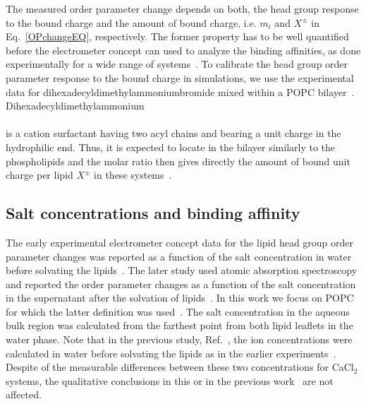 \documentclass[aip,jcp,twocolumn]{revtex4}
\begin{document}
The measured order parameter change depends on both, the head group response 
to the bound charge and the amount of bound charge, i.e. $m_i$ and $X^\pm$
in Eq.~\ref{OPchangeEQ}, respectively. The former property has to be
well quantified before the electrometer concept can used to 
analyze the binding affinities, as done experimentally for a wide range
of systems~\cite{seelig87,beschiasvili91}. To calibrate 
the head group order parameter response to the bound charge in simulations,
we use the experimental data for dihexadecyldimethylammoniumbromide %
mixed within a POPC bilayer~\cite{scherer89}. Dihexadecyldimethylammonium\\[0.5cm]
\vspace{0.5cm} \\
is a cation surfactant having two acyl chains and bearing a unit
charge in the hydrophilic end. Thus, it is expected to locate
in the bilayer similarly to the phospholipids and the molar ratio then 
gives directly the amount of bound unit charge per lipid $X^\pm$ in these systems~\cite{scherer89}.

\subsection{Salt concentrations and binding affinity}
The early experimental electrometer concept data for the lipid head group
order parameter changes was reported as a function 
of the salt concentration in water before solvating
the lipids~\cite{akutsu81}. The later study used atomic absorption
spectroscopy and reported the order parameter changes as
a function of the salt concentration in the supernatant after the
solvation of lipids~\cite{altenbach84}.
In this work we focus on POPC for which the latter definition was used~\cite{altenbach84}.
The salt concentration in the aqueous bulk region was calculated from 
the farthest point from both lipid leaflets in the water phase. 
Note that in the previous study, Ref.~,
the ion concentrations were calculated in water before solvating the lipids 
as in the earlier experiments~\cite{akutsu81}.
Despite of the measurable differences between these two concentrations for CaCl$_2$ systems,
the qualitative conclusions in this or in the previous work~\cite{catte16} are
not affected. 
\end{document}

